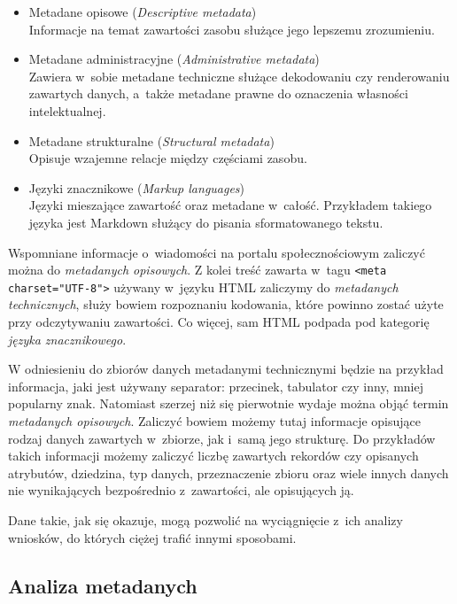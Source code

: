 	\begin{itemize}
		\item Metadane opisowe (\emph{Descriptive metadata}) \\
		Informacje na temat zawartości zasobu służące jego lepszemu zrozumieniu.

		\item Metadane administracyjne (\emph{Administrative metadata}) \\
		Zawiera w~sobie metadane techniczne służące dekodowaniu czy renderowaniu zawartych danych, a~także metadane prawne do oznaczenia własności intelektualnej.

		\item Metadane strukturalne (\emph{Structural metadata}) \\
		Opisuje wzajemne relacje między częściami zasobu.

		\item Języki znacznikowe (\emph{Markup languages}) \\
		Języki mieszające zawartość oraz metadane w~całość.
		Przykładem takiego języka jest Markdown służący do pisania sformatowanego tekstu.
	\end{itemize}

	Wspomniane informacje o~wiadomości na portalu społecznościowym zaliczyć można do \emph{metadanych opisowych}.
	Z kolei treść zawarta w~tagu \lstinline{<meta charset="UTF-8">} używany w~języku HTML zaliczymy do \emph{metadanych technicznych}, służy bowiem rozpoznaniu kodowania, które powinno zostać użyte przy odczytywaniu zawartości.
	Co więcej, sam HTML podpada pod kategorię \emph{języka znacznikowego}.

	W odniesieniu do zbiorów danych metadanymi technicznymi będzie na przykład informacja, jaki jest używany separator: przecinek, tabulator czy inny, mniej popularny znak.
	Natomiast szerzej niż się pierwotnie wydaje można objąć termin \emph{metadanych opisowych}.
	Zaliczyć bowiem możemy tutaj informacje opisujące rodzaj danych zawartych w~zbiorze, jak i~samą jego strukturę.
	Do przykładów takich informacji możemy zaliczyć liczbę zawartych rekordów czy opisanych atrybutów, dziedzina, typ danych, przeznaczenie zbioru oraz wiele innych danych nie wynikających bezpośrednio z~zawartości, ale opisujących ją.

	Dane takie, jak się okazuje, mogą pozwolić na wyciągnięcie z~ich analizy wniosków, do których ciężej trafić innymi sposobami.

	\subsection{Analiza metadanych}

